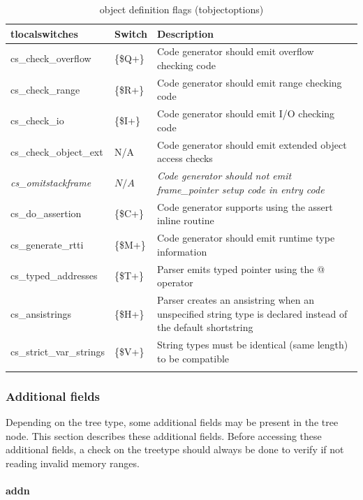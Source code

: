 \documentclass [12pt]{article}
\begin{document}
\begin{longtable}{|l|l|p{10cm}|}
\hline
tlocalswitches & Switch & Description \\
\hline
\endhead
\hline
\endfoot
\textsf{cs{\_}check{\_}overflow} 	&  {\{}{\$}Q+{\}}& 
Code generator should emit overflow checking code  \\
\textsf{cs{\_}check{\_}range}    	&  {\{}{\$}R+{\}}& 
Code generator should emit range checking code  \\
\textsf{cs{\_}check{\_}io} 	 	&  {\{}{\$}I+{\}}& 
Code generator should emit I/O checking code \\
\textsf{cs{\_}check{\_}object{\_}ext} 	&  N/A& 
Code generator should emit extended object access checks \\
\textsf{\textit{cs{\_}omitstackframe}}	&  $N/A$ & 
\textit{Code generator should not emit frame{\_}pointer setup code in entry code} \\
\textsf{cs{\_}do{\_}assertion}		& {\{}{\$}C+{\}} &  
Code generator supports using the assert inline routine \\
\textsf{cs{\_}generate{\_}rtti} 	& {\{}{\$}M+{\}} & 
Code generator should emit runtime type information \\
\textsf{cs{\_}typed{\_}addresses} 	& {\{}{\$}T+{\}}& 
Parser emits typed pointer using the @ operator  \\
\textsf{cs{\_}ansistrings}		& {\{}{\$}H+{\}}& 
Parser creates an \textsf{ansistring} when an unspecified \textsf{string} type is declared instead of the default \textsf{shortstring} \\
\textsf{cs{\_}strict{\_}var{\_}strings} & {\{}{\$}V+{\}}& 
String types must be identical (same length) to be compatible \\
\hline
\caption{object definition flags (tobjectoptions)}
\label{tab8}
\end{longtable}

\subsubsection{Additional fields}
\label{subsubsec:additional}

Depending on the tree type, some additional fields may be present in the 
tree node. This section describes these additional fields. Before accessing 
these additional fields, a check on the \textsf{treetype} should always be 
done to verify if not reading invalid memory ranges.

\paragraph{addn}\mbox{}
\end{document}
